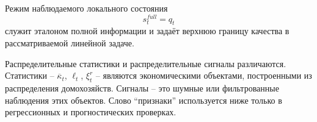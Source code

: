Режим наблюдаемого локального состояния
\[
s_t^{full}=q_t
\]
служит эталоном полной информации и задаёт верхнюю границу качества в рассматриваемой линейной
задаче.

Распределительные статистики и распределительные сигналы различаются. Статистики --
\(\overline{\kappa}_t\), \(\ell_t\), \(\xi_t^r\) -- являются экономическими объектами, построенными
из распределения домохозяйств. Сигналы -- это шумные или фильтрованные наблюдения этих объектов.
Слово ``признаки'' используется ниже только в регрессионных и прогностических проверках.
